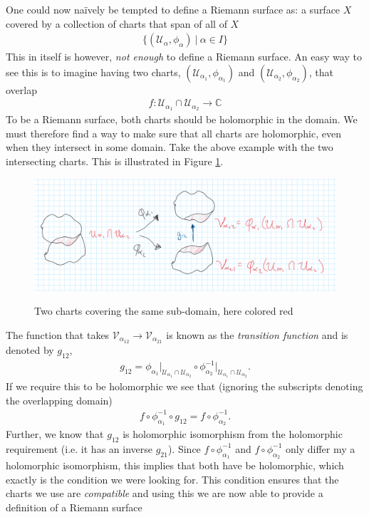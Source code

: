 \documentclass[lettersize,12pt]{article}
\begin{document}
One could now naïvely be tempted to define a Riemann surface as: a surface $X$ covered by a collection of charts that span of all of $X$
\begin{equation}
	\begin{aligned}
		\{(\mathcal{U}_\alpha,\phi_\alpha)~\big|~\alpha\in I\}
	\end{aligned}
\end{equation}
This in itself is however, \textit{not enough} to define a Riemann surface. An easy way to see this is to imagine having two charts, $(\mathcal{U}_{\alpha_1},\phi_{\alpha_1})$ and $(\mathcal{U}_{\alpha_2},\phi_{\alpha_2})$, that overlap
\begin{equation}
	\begin{aligned}
		f:\mathcal{U}_{\alpha_1}\cap \mathcal{U}_{\alpha_2}\to \mathds{C}
	\end{aligned}
\end{equation}
To be a Riemann surface, both charts should be holomorphic in the domain. We must therefore find a way to make sure that all charts are holomorphic, even when they intersect in some domain. Take the above example with the two intersecting charts. This is illustrated in Figure \ref{fig:trans}.
\begin{figure}[H]\centering
	\includegraphics[width=12cm]{5} \label{fig:trans} \caption{Two charts covering the same sub-domain, here colored red}
\end{figure}
The function that takes $\mathcal{V}_{\alpha_{12}}\to \mathcal{V}_{\alpha_{21}}$ is known as the \textit{transition function} and is denoted by $g_{12}$,
\begin{equation}
	\begin{aligned}
		g_{12}=\phi_{\alpha_1}\big|_{\mathcal{U}_{\alpha_1}\cap \mathcal{U}_{\alpha_2}}\circ \phi_{\alpha_2}^{-1}\big|_{\mathcal{U}_{\alpha_1}\cap \mathcal{U}_{\alpha_2}}.
	\end{aligned}
\end{equation}
If we require this to be holomorphic we see that (ignoring the subscripts denoting the overlapping domain)
\begin{equation}
	\begin{aligned}
		f\circ \phi_{\alpha_1}^{-1}\circ g_{12}=f\circ \phi_{\alpha_2}^{-1}.
	\end{aligned}
\end{equation}
Further, we know that $g_{12}$ is holomorphic isomorphism from the holomorphic requirement (i.e. it has an inverse $g_{21}$). Since
$f\circ\phi^{-1}_{\alpha_1}$ and $f\circ\phi^{-1}_{\alpha_2}$ only differ my a holomorphic isomorphism, this implies that both have be holomorphic, which exactly is the condition we were looking for. This condition ensures that the charts we use are \textit{compatible} and using this we are now able to provide a definition of a Riemann surface
\end{document}
